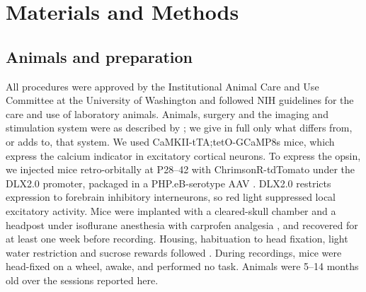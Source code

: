 
\section*{Materials and Methods}

\subsection*{Animals and preparation}

All procedures were approved by the Institutional Animal Care and Use Committee
at the University of Washington and followed NIH guidelines for the care and use
of laboratory animals.
Animals, surgery and the imaging and stimulation system were as described by
\citet{Matveev2024}; we give in full only what differs from, or adds to, that
system. We used CaMKII-tTA;tetO-GCaMP8s
mice, which express the calcium indicator in excitatory cortical neurons. To
express the opsin, we injected mice retro-orbitally at P28--42 with
ChrimsonR-tdTomato under the DLX2.0 promoter, packaged in a PHP.eB-serotype AAV
\citep{Matveev2024}. DLX2.0 restricts expression to forebrain inhibitory
interneurons, so red light suppressed local excitatory activity.
Mice were implanted with a cleared-skull chamber and a headpost under isoflurane
anesthesia with carprofen analgesia \citep{Matveev2024}, and recovered for at
least one week before recording. Housing, habituation to head fixation, light
water restriction and sucrose rewards followed \citet{Matveev2024}. During
recordings, mice were head-fixed on a wheel, awake, and performed no task.
Animals were 5--14 months old over the sessions reported here.

